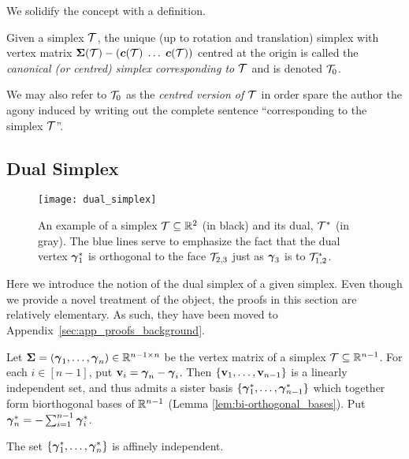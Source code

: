 We solidify the concept with a definition. 

\begin{definition}
	\label{def:centred_simplex}
	Given a simplex $\mathcal{T}$, the unique (up to rotation and translation) simplex with vertex matrix $\boldsymbol{\Sigma}(\mathcal{T}) - (\vb*{c}(\mathcal{T})\;\dots\;\vb*{c}(\mathcal{T}))$ centred at the origin is called the \emph{canonical (or centred) simplex corresponding to $\mathcal{T}$} and is denoted $\mathcal{T}_0$. 
\end{definition}

We may also refer to $\mathcal{T}_0$ as the \emph{centred version of $\mathcal{T}$} in order  spare  the author the agony induced by writing out the complete  sentence ``corresponding to the simplex $\mathcal{T}$''. 

 

\subsection{Dual Simplex}
\label{sec:background_dual_simplex}

\begin{figure}
	\centering
	\texttt{[image: dual\_simplex]}
	\caption{An example of a simplex $\mathcal{T}\subseteq\mathbb{R}^2$ (in black) and its dual, $\mathcal{T}^*$  (in gray).  The blue lines serve to emphasize the  fact that the dual vertex $\vb*{\gamma}_1^*$ is orthogonal to the face $\mathcal{T}_{2,3}$ just as $\vb*{\gamma}_3$ is to $\mathcal{T}^*_{1,2}$. }
	\label{fig:dual_simplex}
\end{figure}
Here we introduce the notion of the dual simplex of a given simplex. Even  though we provide a novel treatment  of  the object, the proofs in this section   are  relatively elementary. As such, they have been moved to Appendix~\ref{sec:app_proofs_background}. 

Let $\boldsymbol{\Sigma}=(\vb*{\gamma}_1,\dots,\vb*{\gamma}_n)\in\mathbb{R}^{n-1\times n}$ be the vertex matrix of a simplex $\mathcal{T}\subseteq\mathbb{R}^{n-1}$. For each $i\in[n-1]$, put $\vb{v}_i=\vb*{\gamma}_n-\vb*{\gamma}_i$. Then $\{\vb{v}_1,\dots,\vb{v}_{n-1}\}$ is a linearly independent set, and thus admits a sister basis $\{\vb*{\gamma}^*_1,\dots,\vb*{\gamma}^*_{n-1}\}$ which together form biorthogonal bases of $\mathbb{R}^{n-1}$ (Lemma \ref{lem:bi-orthogonal_bases}). Put $\vb*{\gamma}^*_n = -\sum_{i=1}^{n-1}\vb*{\gamma}^*_i$.  

\begin{claim}
	\label{claim:affine_independence}
The set 
$\{\vb*{\gamma}^*_1,\dots,\vb*{\gamma}^*_n\}$ is affinely independent. 
\end{claim}

